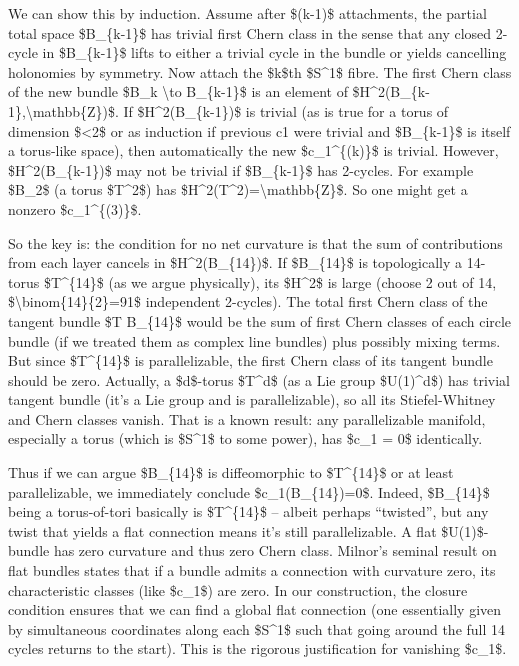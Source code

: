 \documentclass[]{article}
\begin{document}
We can show this by induction. Assume after \$(k-1)\$ attachments, the
partial total space \$B\_\{k-1\}\$ has trivial first Chern class in the
sense that any closed 2-cycle in \$B\_\{k-1\}\$ lifts to either a
trivial cycle in the bundle or yields cancelling holonomies by symmetry.
Now attach the \$k\$th \$S\^{}1\$ fibre. The first Chern class of the
new bundle \$B\_k \textbackslash{}to B\_\{k-1\}\$ is an element of
\$H\^{}2(B\_\{k-1\},\textbackslash{}mathbb\{Z\})\$. If
\$H\^{}2(B\_\{k-1\})\$ is trivial (as is true for a torus of dimension
\$\textless{}2\$ or as induction if previous c1 were trivial and
\$B\_\{k-1\}\$ is itself a torus-like space), then automatically the new
\$c\_1\^{}\{(k)\}\$ is trivial. However, \$H\^{}2(B\_\{k-1\})\$ may not
be trivial if \$B\_\{k-1\}\$ has 2-cycles. For example \$B\_2\$ (a torus
\$T\^{}2\$) has \$H\^{}2(T\^{}2)=\textbackslash{}mathbb\{Z\}\$. So one
might get a nonzero \$c\_1\^{}\{(3)\}\$.

So the key is: the condition for no net curvature is that the sum of
contributions from each layer cancels in \$H\^{}2(B\_\{14\})\$. If
\$B\_\{14\}\$ is topologically a 14-torus \$T\^{}\{14\}\$ (as we argue
physically), its \$H\^{}2\$ is large (choose 2 out of 14,
\$\textbackslash{}binom\{14\}\{2\}=91\$ independent 2-cycles). The total
first Chern class of the tangent bundle \$T B\_\{14\}\$ would be the sum
of first Chern classes of each circle bundle (if we treated them as
complex line bundles) plus possibly mixing terms. But since
\$T\^{}\{14\}\$ is parallelizable, the first Chern class of its tangent
bundle should be zero. Actually, a \$d\$-torus \$T\^{}d\$ (as a Lie
group \$U(1)\^{}d\$) has trivial tangent bundle (it's a Lie group and is
parallelizable), so all its Stiefel-Whitney and Chern classes vanish​.
That is a known result: any parallelizable manifold, especially a torus
(which is \$S\^{}1\$ to some power), has \$c\_1 = 0\$ identically.

Thus if we can argue \$B\_\{14\}\$ is diffeomorphic to \$T\^{}\{14\}\$
or at least parallelizable, we immediately conclude
\$c\_1(B\_\{14\})=0\$. Indeed, \$B\_\{14\}\$ being a torus-of-tori
basically is \$T\^{}\{14\}\$ -- albeit perhaps ``twisted'', but any
twist that yields a flat connection means it's still parallelizable. A
flat \$U(1)\$-bundle has zero curvature and thus zero Chern class​.
Milnor's seminal result on flat bundles states that if a bundle admits a
connection with curvature zero, its characteristic classes (like
\$c\_1\$) are zero​. In our construction, the closure condition ensures
that we can find a global flat connection (one essentially given by
simultaneous coordinates along each \$S\^{}1\$ such that going around
the full 14 cycles returns to the start). This is the rigorous
justification for vanishing \$c\_1\$.
\end{document}
